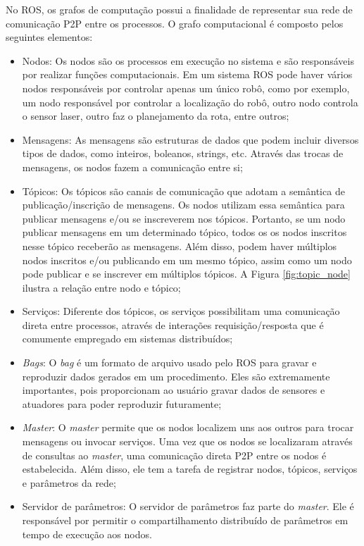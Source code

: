 No ROS, os grafos de computação possui a finalidade de representar sua rede de comunicação P2P entre os processos. O grafo computacional é composto pelos seguintes elementos:

\begin{itemize}
    \addtolength{\itemindent}{2em}
    \setlength\itemsep{1em}
    
    \item Nodos: Os nodos são os processos em execução no sistema e são responsáveis por realizar funções computacionais.  Em um sistema ROS pode haver vários nodos responsáveis por controlar apenas um único robô, como por exemplo, um nodo responsável por controlar a localização do robô, outro nodo controla o sensor laser, outro faz o planejamento da rota, entre outros;
    
    \item Mensagens: As mensagens são estruturas de dados que podem incluir diversos tipos de dados, como inteiros, boleanos, strings, etc. Através das trocas de mensagens, os nodos fazem a comunicação entre si;
    
    \item Tópicos: Os tópicos são canais de comunicação que adotam a semântica de publicação/inscrição de mensagens. Os nodos utilizam essa semântica para publicar mensagens e/ou se inscreverem nos tópicos. Portanto, se um nodo publicar mensagens em um determinado tópico, todos os os nodos inscritos nesse tópico receberão as mensagens. Além disso, podem haver múltiplos nodos inscritos e/ou publicando em um mesmo tópico, assim como um nodo pode publicar e se inscrever em múltiplos tópicos. A Figura \ref{fig:topic_node} ilustra a relação entre nodo e tópico;
    
    \item Serviços: Diferente dos tópicos, os serviços possibilitam uma comunicação direta entre processos, através de interações requisição/resposta que é comumente empregado em sistemas distribuídos;
    
    \item \textit{Bags}: O \textit{bag} é um formato de arquivo usado pelo ROS para gravar e reproduzir dados gerados em um procedimento. Eles são extremamente importantes, pois proporcionam ao usuário gravar dados de sensores e atuadores para poder reproduzir futuramente;
    
    \item \textit{Master}: O \textit{master} permite que os nodos localizem uns aos outros para trocar mensagens ou invocar serviços. Uma vez que os nodos se localizaram através de consultas ao \textit{master}, uma comunicação direta P2P entre os nodos é estabelecida. Além disso, ele tem a tarefa de registrar nodos, tópicos, serviços e parâmetros da rede;
    
    \item Servidor de parâmetros: O servidor de parâmetros faz parte do \textit{master}. Ele é responsável por permitir o compartilhamento distribuído de parâmetros em tempo de execução aos nodos.
\end{itemize}
\hspace{1em}

